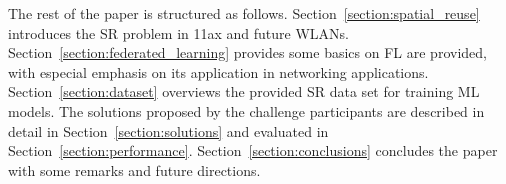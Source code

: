 \documentclass[10pt,a4paper,twocolumn]{article}
\def\starttable{\vspace{6pt}\begin{table}[ht]\center}
\begin{document}
\starttable
\caption{Summary of the ML models proposed by the participants of the challenge \textcolor{red}{(to be done)}.}\label{tab:tab0} 
\begin{small}
\end{small}
\end{table}

The rest of the paper is structured as follows. Section~\ref{section:spatial_reuse} introduces the SR problem in 11ax and future WLANs. Section~\ref{section:federated_learning} provides some basics on FL are provided, with especial emphasis on its application in networking applications. Section~\ref{section:dataset} overviews the provided SR data set for training ML models. The solutions proposed by the challenge participants are described in detail in Section~\ref{section:solutions} and evaluated in Section~\ref{section:performance}. Section~\ref{section:conclusions} concludes the paper with some remarks and future directions.
\end{document}
